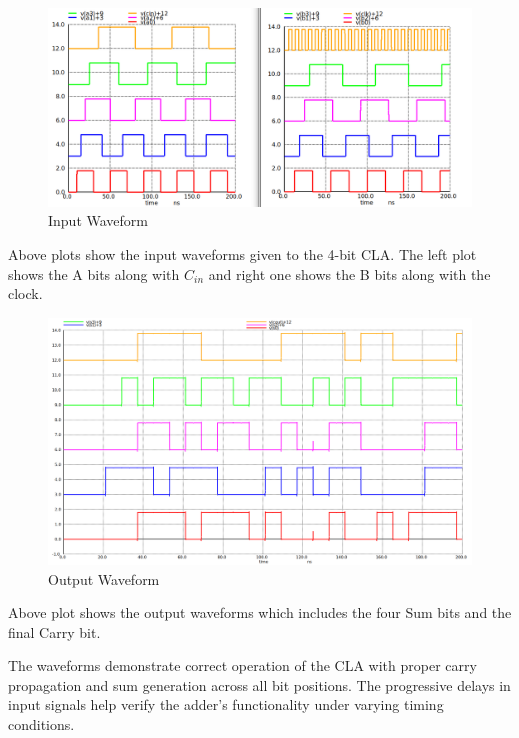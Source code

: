 \documentclass[conference]{IEEEtran}
\begin{document}
\begin{figure}[H]
    \centering
    \includegraphics[width=1\linewidth]{claprengspi.png}
    \caption{Input Waveform}
    \label{fig:cla_waveform}
\end{figure}

Above plots show the input waveforms given to the 4-bit CLA. The left plot shows the A bits along with $C_{in}$ and right one shows the B bits along with the clock.

\begin{figure}[H]
    \centering
    \includegraphics[width=1\linewidth]{claprengspi2.png}
    \caption{Output Waveform}
    \label{fig:cla_terminal}
\end{figure}

Above plot shows the output waveforms which includes the four Sum bits and the final Carry bit.

The waveforms demonstrate correct operation of the CLA with proper carry propagation and sum generation across all bit positions. The progressive delays in input signals help verify the adder's functionality under varying timing conditions.
\end{document}
